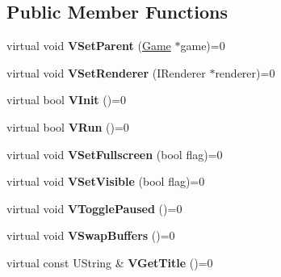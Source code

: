 \subsection*{Public Member Functions}
\begin{DoxyCompactItemize}
\item 
\hypertarget{class_vixen_1_1_game_window_a5495c559298a6b7521128930b0ee2028}{}virtual void {\bfseries V\+Set\+Parent} (\hyperlink{class_vixen_1_1_game}{Game} $\ast$game)=0\label{class_vixen_1_1_game_window_a5495c559298a6b7521128930b0ee2028}

\item 
\hypertarget{class_vixen_1_1_game_window_acf59a55ac615c9bce4bee345faabbcdb}{}virtual void {\bfseries V\+Set\+Renderer} (I\+Renderer $\ast$renderer)=0\label{class_vixen_1_1_game_window_acf59a55ac615c9bce4bee345faabbcdb}

\item 
\hypertarget{class_vixen_1_1_game_window_af4091e56bf04bd3807fb7eeed13092c3}{}virtual bool {\bfseries V\+Init} ()=0\label{class_vixen_1_1_game_window_af4091e56bf04bd3807fb7eeed13092c3}

\item 
\hypertarget{class_vixen_1_1_game_window_ad0d761fd08f7ed90f4a3ba1ba34fc331}{}virtual bool {\bfseries V\+Run} ()=0\label{class_vixen_1_1_game_window_ad0d761fd08f7ed90f4a3ba1ba34fc331}

\item 
\hypertarget{class_vixen_1_1_game_window_a053737174158c647c7f9302ef7f534ba}{}virtual void {\bfseries V\+Set\+Fullscreen} (bool flag)=0\label{class_vixen_1_1_game_window_a053737174158c647c7f9302ef7f534ba}

\item 
\hypertarget{class_vixen_1_1_game_window_a5c170000509d60833929b696cd756c0d}{}virtual void {\bfseries V\+Set\+Visible} (bool flag)=0\label{class_vixen_1_1_game_window_a5c170000509d60833929b696cd756c0d}

\item 
\hypertarget{class_vixen_1_1_game_window_a039d87e99ca8ea1f55f8aaee0000401d}{}virtual void {\bfseries V\+Toggle\+Paused} ()=0\label{class_vixen_1_1_game_window_a039d87e99ca8ea1f55f8aaee0000401d}

\item 
\hypertarget{class_vixen_1_1_game_window_ac660178f1842bc21c680113b21de816a}{}virtual void {\bfseries V\+Swap\+Buffers} ()=0\label{class_vixen_1_1_game_window_ac660178f1842bc21c680113b21de816a}

\item 
\hypertarget{class_vixen_1_1_game_window_a21303c78c69b37521dddaf8c5f4735d2}{}virtual const U\+String \& {\bfseries V\+Get\+Title} ()=0\label{class_vixen_1_1_game_window_a21303c78c69b37521dddaf8c5f4735d2}


\end{DoxyCompactItemize}
